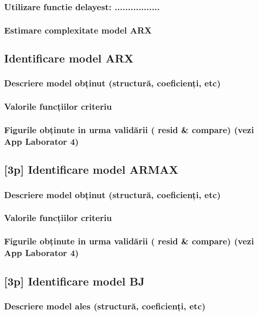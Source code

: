 \documentclass[12pt,english]{article}
\begin{document}
\subsubsection { Utilizare functie delayest: ................. }
\subsubsection { Estimare complexitate model ARX }
\subsection { Identificare model ARX }
\subsubsection { Descriere model obținut (structură, coeficienți, etc) }
\subsubsection { Valorile funcțiilor criteriu }
\subsubsection { Figurile obținute in urma validării ( resid \& compare) (vezi App Laborator 4) }
\subsection { [3p] Identificare model ARMAX }
\subsubsection { Descriere model obținut (structură, coeficienți, etc) }
\subsubsection { Valorile funcțiilor criteriu }
\subsubsection { Figurile obținute in urma validării ( resid \& compare) (vezi App Laborator 4) }
\subsection { [3p] Identificare model BJ }
\subsubsection { Descriere model ales (structură, coeficienți, etc) }
\end{document}
